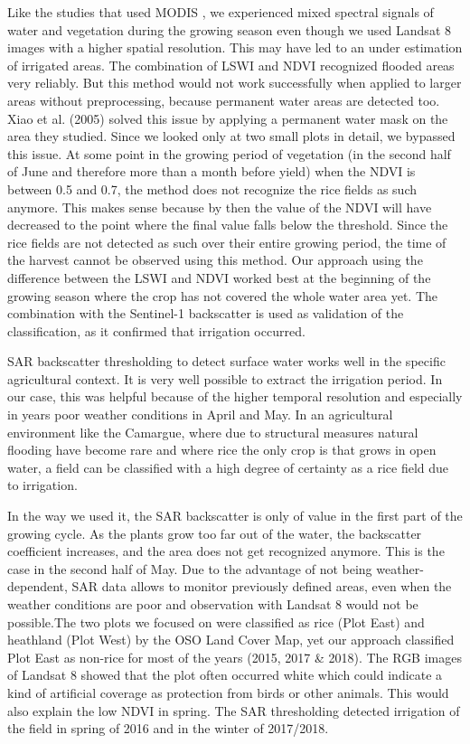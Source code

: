 \documentclass[a4paper, 10pt, conference]{ieeeconf}      %
\begin{document}
Like the studies that used MODIS \cite{Xiao2005MappingImages}, we experienced mixed spectral signals of water and vegetation during the growing season even though we used Landsat 8 images with a higher spatial resolution. This may have led to an under estimation of irrigated areas. The combination of LSWI and NDVI recognized flooded areas very reliably. But this method would not work successfully when applied to larger areas without preprocessing, because permanent water areas are detected too. Xiao et al. (2005) solved this issue by applying a permanent water mask on the area they studied. Since we looked only at two small plots in detail, we bypassed this issue. At some point in the growing period of vegetation (in the second half of June and therefore more than a month before yield) when the NDVI is between 0.5 and 0.7, the method does not recognize the rice fields as such anymore. This makes sense because by then the value of the NDVI will have decreased to the point where the final value falls below the threshold. Since the rice fields are not detected as such over their entire growing period, the time of the harvest cannot be observed using this method. Our approach using the difference between the LSWI and NDVI worked best at the beginning of the growing season where the crop has not covered the whole water area yet. The combination with the Sentinel-1 backscatter is used as validation of the classification, as it confirmed that irrigation occurred.

SAR backscatter thresholding to detect surface water works well in the specific agricultural context. It is very well possible to extract the irrigation period. In our case, this was helpful because of the higher temporal resolution and especially in years poor weather conditions in April and May. In an agricultural environment like the Camargue, where due to structural measures natural flooding have become rare and where rice the only crop is that grows in open water, a field can be classified with a high degree of certainty as a rice field due to irrigation.

In the way we used it, the SAR backscatter is only of value in the first part of the growing cycle. As the plants grow too far out of the water, the backscatter coefficient increases, and the area does not get recognized anymore. This is the case in the second half of May. Due to the advantage of not being weather-dependent, SAR data allows to monitor previously defined areas, even when the weather conditions are poor and observation with Landsat 8 would not be possible.The two plots we focused on were classified as rice (Plot East) and heathland (Plot West) by the OSO Land Cover Map, yet our approach classified Plot East as non-rice for most of the years (2015, 2017 & 2018). The RGB images of Landsat 8 showed that the plot often occurred white which could indicate a kind of artificial coverage as protection from birds or other animals. This would also explain the low NDVI in spring. The SAR thresholding detected irrigation of the field in spring of 2016 and in the winter of 2017/2018. 
\end{document}
